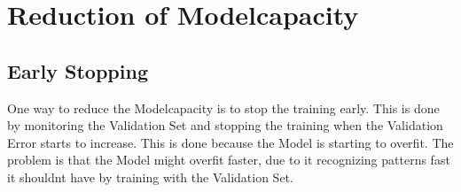 \documentclass[a4paper]{article}
\begin{document}
\section{Reduction of Modelcapacity}
\subsection{Early Stopping}
One way to reduce the Modelcapacity is to stop the training early. This is done by monitoring the Validation Set and stopping the training when the Validation Error starts to increase. This is done because the Model is starting to overfit. The problem is that the Model might overfit faster, due to it recognizing patterns fast it shouldnt have by training with the Validation Set.
\end{document}
